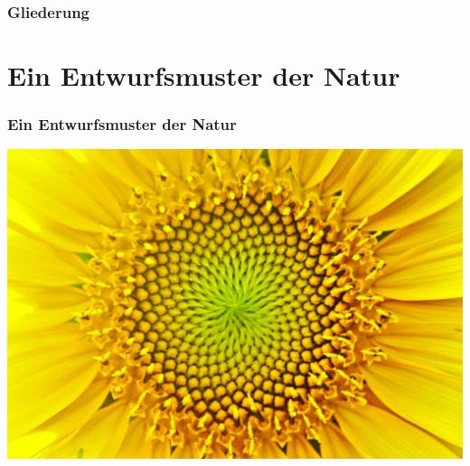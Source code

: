 \documentclass[12pt,compress,english,utf8,t]{beamer}
\begin{document}
\begin{frame}\frametitle{Gliederung}\tableofcontents\end{frame}


\section{Ein Entwurfsmuster der Natur}

\begin{frame}\frametitle{Ein Entwurfsmuster der Natur}
  \begin{center}
    \includegraphics[height=0.6\textheight]{sonnenblume2}
    \bigskip


\end{center}
\end{frame}
\end{document}
